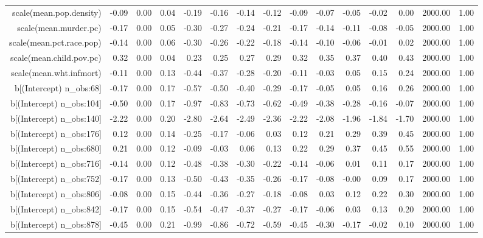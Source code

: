 \begin{table}[ht]
\begin{tabular}{rrrrrrrrrrrrrrr}
  scale(mean.pop.density) & -0.09 & 0.00 & 0.04 & -0.19 & -0.16 & -0.14 & -0.12 & -0.09 & -0.07 & -0.05 & -0.02 & 0.00 & 2000.00 & 1.00 \\ 
  scale(mean.murder.pc) & -0.17 & 0.00 & 0.05 & -0.30 & -0.27 & -0.24 & -0.21 & -0.17 & -0.14 & -0.11 & -0.08 & -0.05 & 2000.00 & 1.00 \\ 
  scale(mean.pct.race.pop) & -0.14 & 0.00 & 0.06 & -0.30 & -0.26 & -0.22 & -0.18 & -0.14 & -0.10 & -0.06 & -0.01 & 0.02 & 2000.00 & 1.00 \\ 
  scale(mean.child.pov.pc) & 0.32 & 0.00 & 0.04 & 0.23 & 0.25 & 0.27 & 0.29 & 0.32 & 0.35 & 0.37 & 0.40 & 0.43 & 2000.00 & 1.00 \\ 
  scale(mean.wht.infmort) & -0.11 & 0.00 & 0.13 & -0.44 & -0.37 & -0.28 & -0.20 & -0.11 & -0.03 & 0.05 & 0.15 & 0.24 & 2000.00 & 1.00 \\ 
  b[(Intercept) n\_obs:68] & -0.17 & 0.00 & 0.17 & -0.57 & -0.50 & -0.40 & -0.29 & -0.17 & -0.05 & 0.05 & 0.16 & 0.26 & 2000.00 & 1.00 \\ 
  b[(Intercept) n\_obs:104] & -0.50 & 0.00 & 0.17 & -0.97 & -0.83 & -0.73 & -0.62 & -0.49 & -0.38 & -0.28 & -0.16 & -0.07 & 2000.00 & 1.00 \\ 
  b[(Intercept) n\_obs:140] & -2.22 & 0.00 & 0.20 & -2.80 & -2.64 & -2.49 & -2.36 & -2.22 & -2.08 & -1.96 & -1.84 & -1.70 & 2000.00 & 1.00 \\ 
  b[(Intercept) n\_obs:176] & 0.12 & 0.00 & 0.14 & -0.25 & -0.17 & -0.06 & 0.03 & 0.12 & 0.21 & 0.29 & 0.39 & 0.45 & 2000.00 & 1.00 \\ 
  b[(Intercept) n\_obs:680] & 0.21 & 0.00 & 0.12 & -0.09 & -0.03 & 0.06 & 0.13 & 0.22 & 0.29 & 0.37 & 0.45 & 0.55 & 2000.00 & 1.00 \\ 
  b[(Intercept) n\_obs:716] & -0.14 & 0.00 & 0.12 & -0.48 & -0.38 & -0.30 & -0.22 & -0.14 & -0.06 & 0.01 & 0.11 & 0.17 & 2000.00 & 1.00 \\ 
  b[(Intercept) n\_obs:752] & -0.17 & 0.00 & 0.13 & -0.50 & -0.43 & -0.35 & -0.26 & -0.17 & -0.08 & -0.00 & 0.09 & 0.17 & 2000.00 & 1.00 \\ 
  b[(Intercept) n\_obs:806] & -0.08 & 0.00 & 0.15 & -0.44 & -0.36 & -0.27 & -0.18 & -0.08 & 0.03 & 0.12 & 0.22 & 0.30 & 2000.00 & 1.00 \\ 
  b[(Intercept) n\_obs:842] & -0.17 & 0.00 & 0.15 & -0.54 & -0.47 & -0.37 & -0.27 & -0.17 & -0.06 & 0.03 & 0.13 & 0.20 & 2000.00 & 1.00 \\ 
  b[(Intercept) n\_obs:878] & -0.45 & 0.00 & 0.21 & -0.99 & -0.86 & -0.72 & -0.59 & -0.45 & -0.30 & -0.17 & -0.02 & 0.10 & 2000.00 & 1.00 \\ 

\end{tabular}
\end{table}

